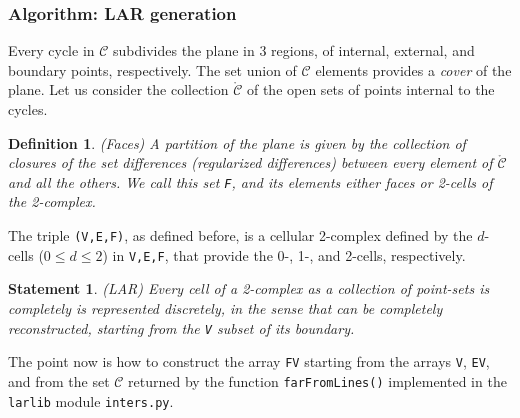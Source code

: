 \documentclass[11pt,oneside]{article}    %
\newtheorem{definition}{Definition}
\newtheorem{statement}{Statement}
\begin{document}
\subsubsection{Algorithm: LAR generation}
\label{sec:larFromCycles}

Every cycle in $\mathcal{C}$ subdivides the plane in 3 regions, of internal, external, and boundary points, respectively. The set union of $\mathcal{C}$ elements provides a \emph{cover} of the plane. Let us consider the collection $\mathring{\mathcal{C}}$ of the open sets of points internal to the cycles.

\begin{definition}{(Faces)}
A partition of the plane is given by the collection of closures of the set differences (\emph{regularized differences}) between every element of $\mathring{\mathcal{C}}$ and all the others. We call this set \texttt{F}, and its elements either \emph{faces} or 2-cells of the 2-complex.
\end{definition}

The triple \texttt{(V,E,F)}, as defined before, is a cellular 2-complex defined by the $d$-cells ($0\leq d\leq 2$) in \texttt{V,E,F}, that provide the 0-, 1-, and 2-cells, respectively. 

\begin{statement}{(LAR)}
Every cell of a 2-complex as a collection of point-sets is completely is represented discretely, in the sense that can be completely reconstructed, starting from the \texttt{V} subset of its boundary.
\end{statement}

The point now is how to construct the array \texttt{FV} starting from the arrays \texttt{V}, \texttt{EV}, and from the set $\mathcal{C}$ returned by the function \texttt{farFromLines()} implemented in the \texttt{larlib} module \texttt{inters.py}.
\end{document}
